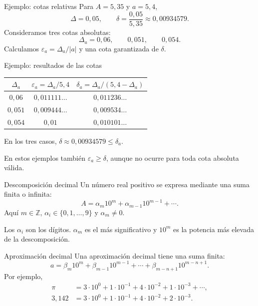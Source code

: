 \documentclass[original_version/main.tex]{subfiles}
\begin{document}
\begin{frame}{Ejemplo: cotas relativas}
Para $A=5{,}35$ y $a=5{,}4$,\[\Delta=0{,}05,\qquad\delta=\frac{0{,}05}{5{,}35}\approx0{,}00934579.\]Consideramos tres cotas absolutas:\[\Delta_a=0{,}06,\qquad0{,}051,\qquad0{,}054.\]Calculamos $\varepsilon_a=\Delta_a/|a|$ y una cota garantizada de $\delta$.
\end{frame}

\begin{frame}{Ejemplo: resultados de las cotas}
\small\begin{center}\begin{tabular}{c|c|c}$\Delta_a$&$\varepsilon_a=\Delta_a/5{,}4$&$\delta_a=\Delta_a/(5{,}4-\Delta_a)$\\\hline $0{,}06$&$0{,}011111\ldots$&$0{,}011236\ldots$\\$0{,}051$&$0{,}009444\ldots$&$0{,}009534\ldots$\\$0{,}054$&$0{,}01$&$0{,}010101\ldots$\end{tabular}\end{center}En los tres casos, $\delta\approx0{,}00934579\le\delta_a$.\par\medskip En estos ejemplos también $\varepsilon_a\ge\delta$, aunque no ocurre para toda cota absoluta válida.
\end{frame}

\begin{frame}{Descomposición decimal}
Un número real positivo se expresa mediante una suma finita o infinita:\[A=\alpha_m10^m+\alpha_{m-1}10^{m-1}+\cdots.\]Aquí $m\in\mathbb Z$, $\alpha_i\in\{0,1,\ldots,9\}$ y $\alpha_m\ne0$.\par\medskip Los $\alpha_i$ son los dígitos. $\alpha_m$ es el más significativo y $10^m$ es la potencia más elevada de la descomposición.
\end{frame}

\begin{frame}{Aproximación decimal}
\small Una aproximación decimal tiene una suma finita:\[a=\beta_m10^m+\beta_{m-1}10^{m-1}+\cdots+\beta_{m-n+1}10^{m-n+1}.\]Por ejemplo,\begin{align*}\pi&=3\cdot10^0+1\cdot10^{-1}+4\cdot10^{-2}+1\cdot10^{-3}+\cdots,\\3{,}142&=3\cdot10^0+1\cdot10^{-1}+4\cdot10^{-2}+2\cdot10^{-3}.\end{align*}
\end{frame}
\end{document}
